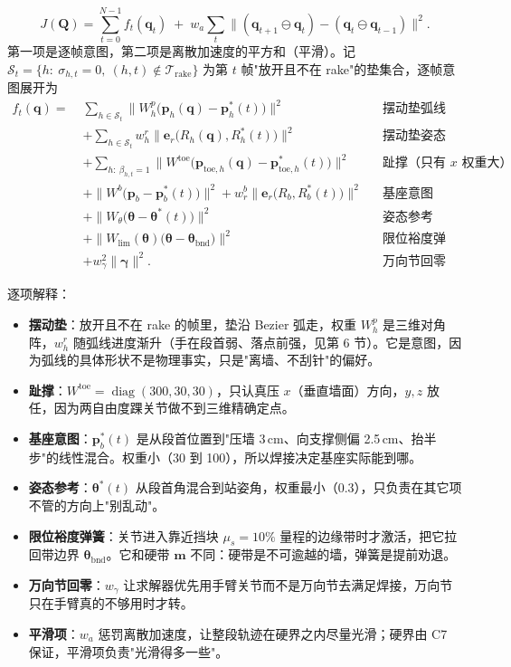 \documentclass[11pt]{article}
\DeclareMathOperator{\diag}{diag}
\begin{document}
\begin{equation}
J(\bm Q)=\sum_{t=0}^{N-1} f_t(\bm q_t)\;+\;w_a\sum_{t}\bigl\|(\bm q_{t+1}\ominus\bm q_t)-(\bm q_t\ominus\bm q_{t-1})\bigr\|^2 .
\label{eq:obj}
\end{equation}
第一项是逐帧意图，第二项是离散加速度的平方和（平滑）。记 $\mathcal S_t=\{h:\ \sigma_{h,t}=0,\ (h,t)\notin\mathcal T_{\mathrm{rake}}\}$ 为第 $t$ 帧"放开且不在 rake"的垫集合，逐帧意图展开为
\begin{equation}
\begin{aligned}
f_t(\bm q)=\;&\sum_{h\in\mathcal S_t}\bigl\|W^p_h\bigl(\bm p_h(\bm q)-\bm p^*_h(t)\bigr)\bigr\|^2 && \text{摆动垫弧线}\\
  &+\sum_{h\in\mathcal S_t} w^r_h\bigl\|\bm e_r\bigl(R_h(\bm q),R^*_h(t)\bigr)\bigr\|^2 && \text{摆动垫姿态}\\
  &+\sum_{h:\ \beta_{h,t}=1}\bigl\|W^{\mathrm{toe}}\bigl(\bm p_{\mathrm{toe},h}(\bm q)-\bm p^*_{\mathrm{toe},h}(t)\bigr)\bigr\|^2 && \text{趾撑（只有 }x\text{ 权重大）}\\
  &+\bigl\|W^b\bigl(\bm p_b-\bm p^*_b(t)\bigr)\bigr\|^2+w^b_r\bigl\|\bm e_r\bigl(R_b,R^*_b(t)\bigr)\bigr\|^2 && \text{基座意图}\\
  &+\bigl\|W_\theta\bigl(\bm\theta-\bm\theta^*(t)\bigr)\bigr\|^2 && \text{姿态参考}\\
  &+\bigl\|W_{\mathrm{lim}}(\bm\theta)\bigl(\bm\theta-\bm\theta_{\mathrm{bnd}}\bigr)\bigr\|^2 && \text{限位裕度弹簧，仅边缘带内激活}\\
  &+w_\gamma^2\|\bm\gamma\|^2 . && \text{万向节回零}
\end{aligned}
\label{eq:ft}
\end{equation}

逐项解释：
\begin{itemize}[leftmargin=1.6em]
\item \textbf{摆动垫}：放开且不在 rake 的帧里，垫沿 Bezier 弧走，权重 $W^p_h$ 是三维对角阵，$w^r_h$ 随弧线进度渐升（手在段首弱、落点前强，见第 6 节）。它是意图，因为弧线的具体形状不是物理事实，只是"离墙、不刮针"的偏好。
\item \textbf{趾撑}：$W^{\mathrm{toe}}=\diag(300,30,30)$，只认真压 $x$（垂直墙面）方向，$y,z$ 放任，因为两自由度踝关节做不到三维精确定点。
\item \textbf{基座意图}：$\bm p^*_b(t)$ 是从段首位置到"压墙 3\,cm、向支撑侧偏 2.5\,cm、抬半步"的线性混合。权重小（30 到 100），所以焊接决定基座实际能到哪。
\item \textbf{姿态参考}：$\bm\theta^*(t)$ 从段首角混合到站姿角，权重最小（0.3），只负责在其它项不管的方向上"别乱动"。
\item \textbf{限位裕度弹簧}：关节进入靠近挡块 $\mu_s=10\%$ 量程的边缘带时才激活，把它拉回带边界 $\bm\theta_{\mathrm{bnd}}$。它和硬带 $\bm m$ 不同：硬带是不可逾越的墙，弹簧是提前劝退。
\item \textbf{万向节回零}：$w_\gamma$ 让求解器优先用手臂关节而不是万向节去满足焊接，万向节只在手臂真的不够用时才转。
\item \textbf{平滑项}：$w_a$ 惩罚离散加速度，让整段轨迹在硬界之内尽量光滑；硬界由 C7 保证，平滑项负责"光滑得多一些"。
\end{itemize}
\end{document}
